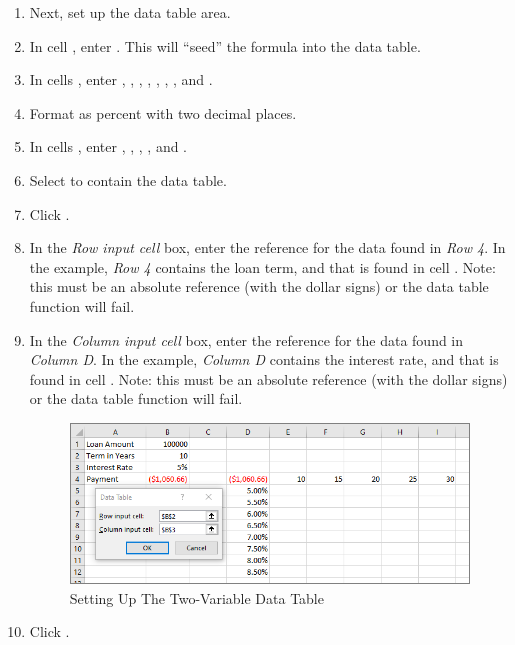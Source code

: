 \begin{enumerate}
	\item Next, set up the data table area.
	\item In cell , enter . This will ``seed'' the  formula into the data table.
	\item In cells , enter , , , , , , , and .
	\item Format  as percent with two decimal places.
	\item In cells , enter , , , , and .
	\item Select  to contain the data table.
	\item Click .
	\item In the \textit{Row input cell} box, enter the reference for the data found in \textit{Row 4}. In the example, \textit{Row 4} contains the loan term, and that is found in cell . Note: this must be an absolute reference (with the dollar signs) or the data table function will fail.
	\item In the \textit{Column input cell} box, enter the reference for the data found in \textit{Column D}. In the example, \textit{Column D} contains the interest rate, and that is found in cell . Note: this must be an absolute reference (with the dollar signs) or the data table function will fail.

	\begin{figure}[H]
		\centering
		\includegraphics[width=\maxwidth{.95\linewidth}]{gfx/ch08_fig44}
		\caption{Setting Up The Two-Variable Data Table}
		\label{08:fig44}
	\end{figure}

	\item Click .
\end{enumerate}


